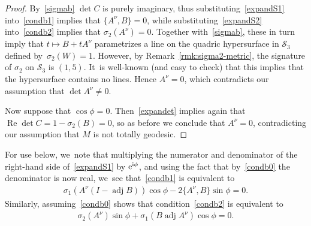 \documentclass[10pt,a4paper]{amsart}
\def\ri{\mathrm{i}}
\renewcommand{\Re}{\operatorname{Re}}
\def\adj{\operatorname{adj}}
\def\calS{\mathcal{S}}
\numberwithin{equation}{section}
\begin{document}
\begin{proof}
By~\eqref{sigmab} $\det C$ is purely imaginary, thus substituting~\eqref{expandS1} into~\eqref{condb1} implies that $\{A^\nu, B\}=0$, while substituting~\eqref{expandS2} into~\eqref{condb2} implies that $\sigma_2(A^\nu)=0$. Together with~\eqref{sigmab}, these in turn imply that $t \mapsto B + t A^\nu$ parametrizes a line on the quadric hypersurface in $\calS_3$ defined by~$\sigma_2(W) = 1$. However, by Remark~\ref{rmk:sigma2-metric}, the signature of $\sigma_2$ on $\calS_3$ is $(1,5)$. It~is well-known (and easy to check) that this implies that the hypersurface contains no lines. Hence $A^\nu=0$, which contradicts our assumption that $\det A^\nu \ne 0$.

Now suppose that $\cos\phi =0$. Then~\eqref{expandet} implies again that $\Re \det C = 1-\sigma_2(B) = 0$, so as before we conclude that $A^\nu=0$, contradicting our assumption that $M$ is not totally geodesic.
\end{proof}

For use below, we~note that multiplying the numerator and denominator of the right-hand side of~\eqref{expandS1} by ${\rm e}^{\ri \phi}$, and using the
fact that by~\eqref{condb0} the denominator is now real, we~see that~\eqref{condb1} is equivalent to
\begin{gather} \label{condc1}
\sigma_1(A^\nu (I -\adj B)) \cos \phi - 2 \{A^\nu,B\}\sin\phi = 0.
\end{gather}
Similarly, assuming~\eqref{condb0} shows that condition~\eqref{condb2} is equivalent to
\begin{gather} \label{condc2}
\sigma_2(A^\nu) \sin\phi + \sigma_1( B \adj A^\nu) \cos\phi = 0.
\end{gather}
\end{document}
